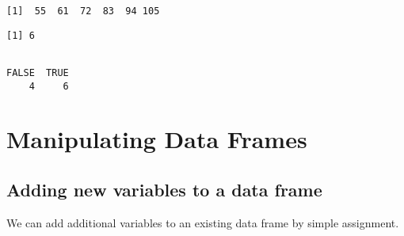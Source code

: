 \begin{knitrout}
{\begin{kframe}
\begin{flushleft}
\normalfont
\end{flushleft}
\begin{verbatim}
[1]  55  61  72  83  94 105
\end{verbatim}
\begin{flushleft}
\ttfamily\noindent
{}\hlkeyword{(}\hlkeyword{(}\hlkeyword{+}{\ }\hlkeyword{)}\hlkeyword{[}\hlkeyword{+}{\ }\hlkeyword{\usebox{\hlnormalsizeboxgreaterthan}}{\ }\hlkeyword{]}\hlkeyword{)}\mbox{}
\normalfont
\end{flushleft}
\begin{verbatim}
[1] 6
\end{verbatim}
\begin{flushleft}
\ttfamily\noindent
{}\hlkeyword{(}\hlkeyword{+}{\ }\hlkeyword{\usebox{\hlnormalsizeboxgreaterthan}}{\ }\hlkeyword{)}\mbox{}
\normalfont
\end{flushleft}
\begin{verbatim}

FALSE  TRUE 
    4     6 
\end{verbatim}
\end{kframe}}
\end{knitrout}


%

%

\section{Manipulating Data Frames}
\label{sec:manipulatingData}%

\subsection{Adding new variables to a data frame}
We can add additional variables to an existing data frame by simple assignment.

